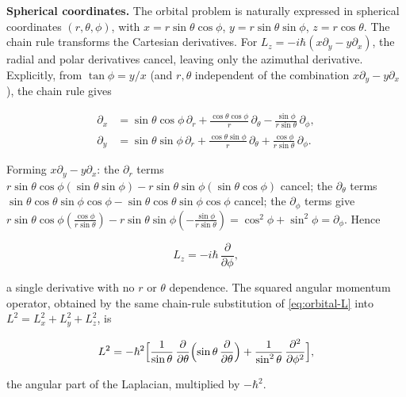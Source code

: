 \medskip\noindent\textbf{Spherical coordinates.}
The orbital problem is naturally expressed in spherical coordinates $(r,\theta,\phi)$, with $x = r\sin\theta\cos\phi$, $y = r\sin\theta\sin\phi$, $z = r\cos\theta$. The chain rule transforms the Cartesian derivatives. For $L_z = -i\hbar(x\partial_y - y\partial_x)$, the radial and polar derivatives cancel, leaving only the azimuthal derivative. Explicitly, from $\tan\phi = y/x$ (and $r,\theta$ independent of the combination $x\partial_y-y\partial_x$), the chain rule gives
\begin{linenomath}
\begin{align*}
\partial_x &= \sin\theta\cos\phi\,\partial_r + \frac{\cos\theta\cos\phi}{r}\,\partial_\theta - \frac{\sin\phi}{r\sin\theta}\,\partial_\phi,\\
\partial_y &= \sin\theta\sin\phi\,\partial_r + \frac{\cos\theta\sin\phi}{r}\,\partial_\theta + \frac{\cos\phi}{r\sin\theta}\,\partial_\phi.
\end{align*}
\end{linenomath}
Forming $x\partial_y - y\partial_x$: the $\partial_r$ terms $r\sin\theta\cos\phi(\sin\theta\sin\phi) - r\sin\theta\sin\phi(\sin\theta\cos\phi)$ cancel; the $\partial_\theta$ terms $\sin\theta\cos\theta\sin\phi\cos\phi - \sin\theta\cos\theta\sin\phi\cos\phi$ cancel; the $\partial_\phi$ terms give $r\sin\theta\cos\phi(\frac{\cos\phi}{r\sin\theta}) - r\sin\theta\sin\phi(-\frac{\sin\phi}{r\sin\theta}) = \cos^2\phi + \sin^2\phi = \partial_\phi$. Hence
\begin{linenomath}
  \begin{equation}
    L_z = -i\hbar\,\frac{\partial}{\partial\phi},
    \label{eq:Lz-phi}
  \end{equation}
\end{linenomath}
a single derivative with no $r$ or $\theta$ dependence. The squared angular momentum operator, obtained by the same chain-rule substitution of \eqref{eq:orbital-L} into $L^2 = L_x^2 + L_y^2 + L_z^2$, is
\begin{linenomath}
  \begin{equation}
    L^2 = -\hbar^2\Bigl[
      \frac{1}{\sin\theta}\,\frac{\partial}{\partial\theta}
      \Bigl(\sin\theta\,\frac{\partial}{\partial\theta}\Bigr)
      + \frac{1}{\sin^2\theta}\,\frac{\partial^2}{\partial\phi^2}
    \Bigr],
  \end{equation}
\end{linenomath}
the angular part of the Laplacian, multiplied by $-\hbar^2$.


